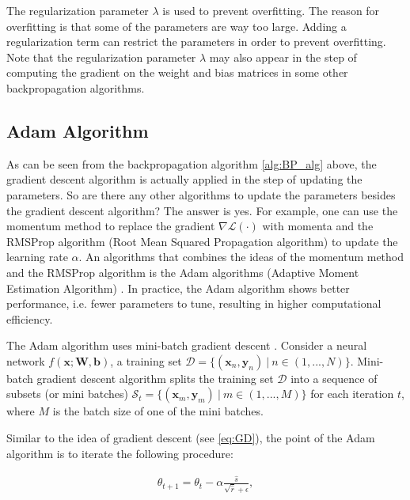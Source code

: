 \documentclass[
	parskip, 			   %
	twoside, 			   %
	DIV=14, 			   %
	BCOR=15.0mm, 		   %
	headsepline, 		   %
	open=right, 		   %
	captions=tableheading, %
	bibliography=totoc,    %
	numbers=noenddot       %
]{scrreprt}
\begin{document}
The regularization parameter $\lambda$ is used to prevent overfitting. The reason for overfitting is that some of the parameters are way too large. Adding a regularization term can restrict the parameters in order to prevent overfitting. Note that the regularization parameter $\lambda$ may also appear in the step of computing the gradient on the weight and bias matrices in some other backpropagation algorithms.

\subsection{Adam Algorithm}
As can be seen from the backpropagation algorithm \ref{alg:BP_alg} above, the gradient descent algorithm is actually applied in the step of updating the parameters. So are there any other algorithms to update the parameters besides the gradient descent algorithm? The answer is yes. For example, one can use the momentum method to replace the gradient $\nabla \mathcal{L}(\cdot)$ with momenta and the RMSProp algorithm (Root Mean Squared Propagation algorithm) \cite{tieleman2012divide} to update the learning rate $\alpha$. An algorithms that combines the ideas of the momentum method and the RMSProp algorithm is the Adam algorithms (Adaptive Moment Estimation Algorithm) \cite{kingma2014adam}. In practice, the Adam algorithm shows better performance, i.e. fewer parameters to tune, resulting in higher computational efficiency.

The Adam algorithm uses mini-batch gradient descent \cite{bottou2010large}. Consider a neural network $f(\mathbf{x};\mathbf{W},\mathbf{b})$, a training set $\mathcal{D}=\{(\mathbf{x}_{n}, \mathbf{y}_{n})   \: \vert \:  n \in (1, ..., N)  \}$. Mini-batch gradient descent algorithm splits the training set $\mathcal{D}$ into a sequence of subsets (or mini batches) $\mathcal{S}_t=\{(\mathbf{x}_{m}, \mathbf{y}_{m})   \: \vert \:  m \in (1, ..., M)  \}$ for each iteration $t$, where $M$ is the batch size of one of the mini batches.

Similar to the idea of gradient descent (see \ref{eq:GD}), the point of the Adam algorithm is to iterate the following procedure:

\begin{equation}
    \label{eq:Adam_GD}
    \begin{aligned}
        \theta_{t+1} = \theta_{t} - \alpha \frac{\hat{s}}{\sqrt{\hat{r}} + \epsilon},
    \end{aligned}
\end{equation}
\end{document}
